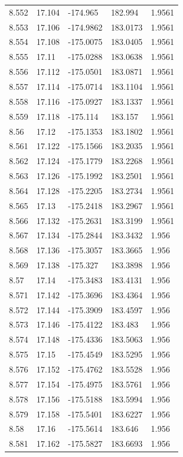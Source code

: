 \begin{tabular}{lllll}
8.552 & 17.104 & -174.965 & 182.994 & 1.9561 \\
8.553 & 17.106 & -174.9862 & 183.0173 & 1.9561 \\
8.554 & 17.108 & -175.0075 & 183.0405 & 1.9561 \\
8.555 & 17.11 & -175.0288 & 183.0638 & 1.9561 \\
8.556 & 17.112 & -175.0501 & 183.0871 & 1.9561 \\
8.557 & 17.114 & -175.0714 & 183.1104 & 1.9561 \\
8.558 & 17.116 & -175.0927 & 183.1337 & 1.9561 \\
8.559 & 17.118 & -175.114 & 183.157 & 1.9561 \\
8.56 & 17.12 & -175.1353 & 183.1802 & 1.9561 \\
8.561 & 17.122 & -175.1566 & 183.2035 & 1.9561 \\
8.562 & 17.124 & -175.1779 & 183.2268 & 1.9561 \\
8.563 & 17.126 & -175.1992 & 183.2501 & 1.9561 \\
8.564 & 17.128 & -175.2205 & 183.2734 & 1.9561 \\
8.565 & 17.13 & -175.2418 & 183.2967 & 1.9561 \\
8.566 & 17.132 & -175.2631 & 183.3199 & 1.9561 \\
8.567 & 17.134 & -175.2844 & 183.3432 & 1.956 \\
8.568 & 17.136 & -175.3057 & 183.3665 & 1.956 \\
8.569 & 17.138 & -175.327 & 183.3898 & 1.956 \\
8.57 & 17.14 & -175.3483 & 183.4131 & 1.956 \\
8.571 & 17.142 & -175.3696 & 183.4364 & 1.956 \\
8.572 & 17.144 & -175.3909 & 183.4597 & 1.956 \\
8.573 & 17.146 & -175.4122 & 183.483 & 1.956 \\
8.574 & 17.148 & -175.4336 & 183.5063 & 1.956 \\
8.575 & 17.15 & -175.4549 & 183.5295 & 1.956 \\
8.576 & 17.152 & -175.4762 & 183.5528 & 1.956 \\
8.577 & 17.154 & -175.4975 & 183.5761 & 1.956 \\
8.578 & 17.156 & -175.5188 & 183.5994 & 1.956 \\
8.579 & 17.158 & -175.5401 & 183.6227 & 1.956 \\
8.58 & 17.16 & -175.5614 & 183.646 & 1.956 \\
8.581 & 17.162 & -175.5827 & 183.6693 & 1.956 \\

\end{tabular}
